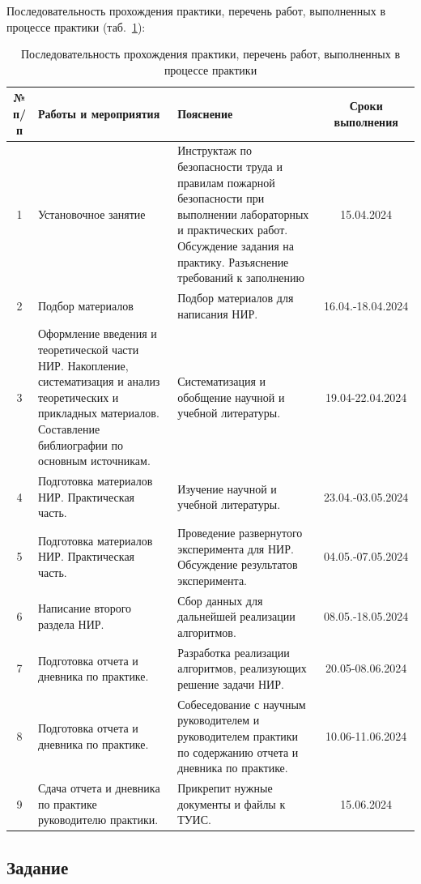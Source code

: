 Последовательность прохождения практики, перечень работ, выполненных в процессе практики (таб.~\ref{tabl:1}):
\begin{center}
\begin{table}[H]
\centering
\caption{Последовательность прохождения практики, перечень работ, выполненных в процессе практики}
\label{tabl:1}
\begin{tabular}{|c|m{5cm}|m{6cm}|c|}
\hline
№ п/п & Работы и мероприятия & Пояснение & Сроки выполнения \\
\hline
1 & Установочное занятие & Инструктаж по безопасности труда и правилам пожарной безопасности при выполнении лабораторных и практических работ. Обсуждение задания на практику. Разъяснение требований к заполнению & 15.04.2024 \\
\hline
2 & Подбор материалов & Подбор материалов для написания НИР. & 16.04.-18.04.2024 \\
\hline
3 & Оформление введения и теоретической части НИР. Накопление, систематизация и анализ теоретических и прикладных материалов. Составление библиографии по основным источникам. & Систематизация и обобщение научной и учебной литературы. & 19.04-22.04.2024 \\
\hline
4 & Подготовка материалов НИР. Практическая часть. & Изучение научной и учебной литературы. & 23.04.-03.05.2024 \\
\hline
5 & Подготовка материалов НИР. Практическая часть. & Проведение развернутого эксперимента для НИР. Обсуждение результатов эксперимента. & 04.05.-07.05.2024 \\
\hline
6 & Написание второго раздела НИР. & Сбор данных для дальнейшей реализации алгоритмов. & 08.05.-18.05.2024 \\
\hline
7 & Подготовка отчета и дневника по практике. & Разработка реализации алгоритмов, реализующих решение задачи НИР. & 20.05-08.06.2024 \\
\hline
8 & Подготовка отчета и дневника по практике. & Собеседование с научным руководителем и руководителем практики по содержанию отчета и дневника по практике. & 10.06-11.06.2024 \\
\hline
9 & Сдача отчета и дневника по практике руководителю практики. & Прикрепит нужные документы и файлы к ТУИС. & 15.06.2024 \\
\hline
\end{tabular}
\end{table}
\end{center}


\subsection{Задание}

